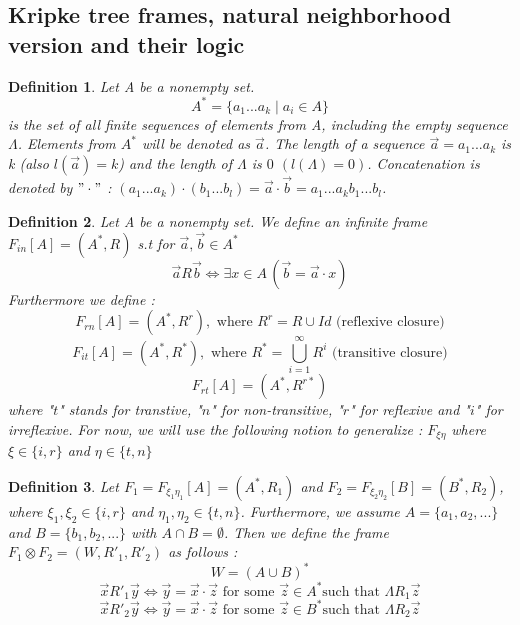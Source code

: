 \documentclass[12pt, a4paper]{scrartcl}
\newtheorem{definition}{Definition}[subsection]
\begin{document}
\subsection{Kripke tree frames, natural neighborhood version and their logic}

\begin{definition}
    Let A be a nonempty set.
    $$A^* = \{a_1...a_k \mid a_i \in A\}$$ 
    is the set of all finite sequences of elements from A, including the empty sequence $\Lambda$.
    Elements from $A^*$ will be denoted as $\vec{a}$. The length of a sequence $\vec{a} = a_1...a_k$ is k (also $l(\vec{a}) = k$) 
    and the length of $\Lambda$ is $0$ $(l(\Lambda) = 0)$. Concatenation is denoted by $"\cdot"$ : $(a_1...a_k) \cdot (b_1...b_l) = \vec{a} \cdot \vec{b} = a_1...a_kb_1...b_l$.

\end{definition}

\begin{definition}
    Let A be a nonempty set. We define an infinite frame $F_{in}[A] = (A^*, R)$ s.t for $\vec{a}, \vec{b} \in A^*$ 
    $$\vec{a}R\vec{b} \Leftrightarrow \exists x \in A \, (\vec{b} = \vec{a} \cdot x)$$
    Furthermore we define : 
    $$F_{rn}[A] = (A^*,R^r), \mbox{ where } R^r = R \cup Id \mbox{ (reflexive closure)}$$
    $$F_{it}[A] = (A^*,R^*), \mbox{ where } R^* = \bigcup_{i=1}^{\infty}R^i \mbox{ (transitive closure)}$$
    $$F_{rt}[A] = (A^*, R^{r*})$$ \newline
    where "$t$" stands for transtive, "$n$" for non-transitive, "$r$" for reflexive and "$i$" for irreflexive. \newline
    For now, we will use the following notion to generalize : $F_{\xi \eta}$ where $\xi \in \{i,r\}$ and $\eta \in \{t,n\}$ \newline
\end{definition}

\begin{definition}
    Let $F_1 = F_{\xi_1 \eta_1}[A] = (A^*,R_1)$ and $F_2 = F_{\xi_2 \eta_2}[B] = (B^*,R_2)$, where $\xi_1, \xi_2 \in \{i,r\}$ 
    and $\eta_1, \eta_2 \in \{t,n\}$. Furthermore, we assume $A = \{a_1, a_2,...\}$ and $B = \{b_1,b_2,...\}$ with $A \cap B = \emptyset$. Then we define the frame $F_1 \otimes F_2 = (W, R'_1, R'_2)$ as follows :
    $$W = (A \cup B)^*$$
    $$\vec{x} R'_1 \vec{y} \Leftrightarrow \vec{y} = \vec{x} \cdot \vec{z} \mbox{ for some } \vec{z} \in A^* \mbox{such that }\Lambda R_1 \vec{z}$$
    $$\vec{x} R'_2 \vec{y} \Leftrightarrow \vec{y} = \vec{x} \cdot \vec{z} \mbox{ for some } \vec{z} \in B^* \mbox{such that }\Lambda R_2 \vec{z}$$
\end{definition}
\end{document}
